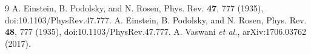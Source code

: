 \begin{thebibliography}{9}
 A. Einstein, B. Podolsky, and N. Rosen, Phys. Rev. \textbf{47}, 777 (1935), doi:10.1103/PhysRev.47.777.
 A. Einstein, B. Podolsky, and N. Rosen, Phys. Rev. \textbf{48}, 777 (1935), doi:10.1103/PhysRev.47.777.
 A. Vaswani \textit{et al.}, arXiv:1706.03762 (2017).
\end{thebibliography}
